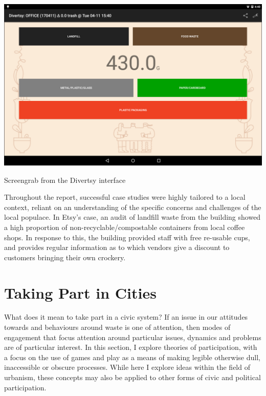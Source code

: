 \documentclass[nofonts,nols,justified,nobib]{tufte-book}
\begin{document}
\begin{marginfigure}
\includegraphics[width=\textwidth]{img/1/divertsy.png}
\caption{Screengrab from the Divertsy interface \cite{benninger_divertsy_2019} \label{b}}
\end{marginfigure}


Throughout the report, successful case studies were highly tailored to a local context, reliant on an understanding of the specific concerns and challenges of the local populace. In Etsy's case, an audit of landfill waste from the building showed a high proportion of non-recyclable/compostable containers from local coffee shops. In response to this, the building provided staff with free re-usable cups, and provides regular information as to which vendors give a discount to customers bringing their own crockery.

\section*{Taking Part in Cities}
What does it mean to take part in a civic system? If an issue in our attitudes towards and behaviours around waste is one of attention, then modes of engagement that focus attention around particular issues, dynamics and problems are of particular interest. In this section, I explore theories of participation, with a focus on the use of games and play as a means of making legible otherwise dull, inaccessible or obscure processes. While here I explore ideas within the field of urbanism, these concepts may also be applied to other forms of civic and political participation.
\end{document}
